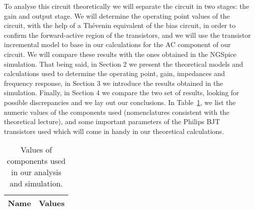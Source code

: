 To analyse this circuit theoretically we will separate the circuit in two stages: the gain and output stage. We will determine the operating point values of the circuit, with the help of a Thévenin equivalent of the bias circuit, in order to confirm the forward-active region of the transistors, and we will use the transistor incremental model to base in our calculations for the AC component of our circuit. We will compare these results with the ones obtained in the NGSpice simulation.
That being said, in Section 2 we present the theoretical models and calculations used to determine the operating point, gain, impedances and frequency response, in Section 3 we introduce the results obtained in the simulation. Finally, in Section 4 we compare the two set of results, looking for possible discrepancies and we lay out our conclusions.
In Table~\ref{tab:data}, we list the numeric values of the components used (nomenclatures consistent with the theoretical lecture), and some important parameters of the Philips BJT transistors used which will come in handy in our theoretical calculations.

\begin{table}[h]
  \centering
  \begin{tabular}{|l|r|}
    \hline    
    {\bf Name} & {\bf Values} \\ \hline
     
  \end{tabular}
  \caption{Values of components used in our analysis and simulation.}
  \label{tab:data}
\end{table}

